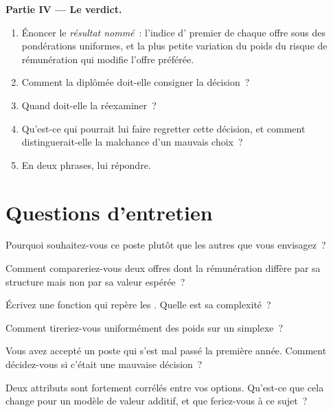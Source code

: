 \begin{problem}
\medskip\noindent\textbf{Partie IV --- Le verdict.}
\begin{enumerate}[resume]
\item Énoncer le \emph{résultat nommé}~: l'indice d' premier de chaque offre sous des pondérations uniformes, et la plus petite
variation du poids du risque de rémunération qui modifie l'offre préférée.
\item Comment la diplômée doit-elle consigner la décision~?
\item Quand doit-elle la réexaminer~?
\item Qu'est-ce qui pourrait lui faire regretter cette décision, et comment distinguerait-elle la malchance d'un mauvais choix~?
\item En deux phrases, lui répondre.
\end{enumerate}
\end{problem}

\section{Questions d'entretien}

\begin{interviewq}\label{iq:in:choosing:1}
Pourquoi souhaitez-vous ce poste plutôt que les autres que vous envisagez~?
\end{interviewq}

\begin{interviewq}\label{iq:in:choosing:2}
Comment compareriez-vous deux offres dont la rémunération diffère par sa structure mais non par sa valeur espérée~?
\end{interviewq}

\begin{interviewq}\label{iq:in:choosing:3}
Écrivez une fonction qui repère les . Quelle est sa complexité~?
\end{interviewq}

\begin{interviewq}\label{iq:in:choosing:4}
Comment tireriez-vous uniformément des poids sur un simplexe~?
\end{interviewq}

\begin{interviewq}\label{iq:in:choosing:5}
Vous avez accepté un poste qui s'est mal passé la première année. Comment décidez-vous si c'était une mauvaise décision~?
\end{interviewq}

\begin{interviewq}\label{iq:in:choosing:6}
Deux attributs sont fortement corrélés entre vos options. Qu'est-ce que cela change pour un modèle de valeur additif, et que
feriez-vous à ce sujet~?
\end{interviewq}
